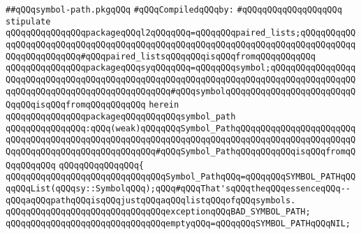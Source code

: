 \label{src/lib/compiler/front/typer-stuff/basics/symbol-path.pkg}
\verb|##qQQqsymbol-path.pkgqQQq|\newline
\newline
\verb|#qQQqCompiledqQQqby:|\newline
\verb|#qQQqqQQqqQQqqQQqqQQq|\newline
\newline
\verb|stipulate|\newline
\verb|qQQqqQQqqQQqqQQqpackageqQQql2qQQqqQQq=qQQqqQQqpaired_lists;qQQqqQQqqQQqqQQqqQQqqQQqqQQqqQQqqQQqqQQqqQQqqQQqqQQqqQQqqQQqqQQqqQQqqQQqqQQqqQQqqQQqqQQqqQQqqQQq#qQQqpaired_listsqQQqqQQqisqQQqfromqQQqqQQqqQQq|\newline
\verb|qQQqqQQqqQQqqQQqpackageqQQqsyqQQqqQQq=qQQqqQQqsymbol;qQQqqQQqqQQqqQQqqQQqqQQqqQQqqQQqqQQqqQQqqQQqqQQqqQQqqQQqqQQqqQQqqQQqqQQqqQQqqQQqqQQqqQQqqQQqqQQqqQQqqQQqqQQqqQQqqQQqqQQq#qQQqsymbolqQQqqQQqqQQqqQQqqQQqqQQqqQQqqQQqisqQQqfromqQQqqQQqqQQq|\newline
\verb|herein|\newline
\newline
\newline
\verb|qQQqqQQqqQQqqQQqpackageqQQqqQQqqQQqsymbol_path|\newline
\verb|qQQqqQQqqQQqqQQq:qQQq(weak)qQQqqQQqSymbol_PathqQQqqQQqqQQqqQQqqQQqqQQqqQQqqQQqqQQqqQQqqQQqqQQqqQQqqQQqqQQqqQQqqQQqqQQqqQQqqQQqqQQqqQQqqQQqqQQqqQQqqQQqqQQqqQQqqQQqqQQqqQQq#qQQqSymbol_PathqQQqqQQqqQQqisqQQqfromqQQqqQQqqQQq|\newline
\verb|qQQqqQQqqQQqqQQq{|\newline
\verb|qQQqqQQqqQQqqQQqqQQqqQQqqQQqqQQqSymbol_PathqQQq=qQQqqQQqSYMBOL_PATHqQQqqQQqList(qQQqsy::SymbolqQQq);qQQq#qQQqThat'sqQQqtheqQQqessenceqQQq--qQQqaqQQqpathqQQqisqQQqjustqQQqaqQQqlistqQQqofqQQqsymbols.|\newline
\newline
\verb|qQQqqQQqqQQqqQQqqQQqqQQqqQQqqQQqexceptionqQQqBAD_SYMBOL_PATH;|\newline
\newline
\verb|qQQqqQQqqQQqqQQqqQQqqQQqqQQqqQQqemptyqQQq=qQQqqQQqSYMBOL_PATHqQQqNIL;|\newline
